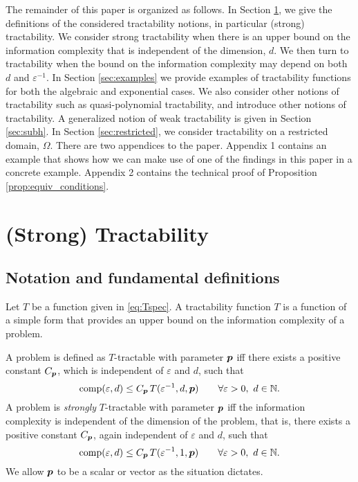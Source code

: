 \documentclass[sort&compress]{elsarticle}
\begin{document}
The remainder of this paper is organized as follows. In Section \ref{sec:spt}, we give the definitions of the considered tractability notions, in particular (strong) tractability. We consider strong tractability when there is an upper bound on the information complexity that is independent of the dimension, $d$. We then turn to tractability when the bound on the information complexity may depend on both $d$ and $\varepsilon^{-1}$. In Section \ref{sec:examples} we provide examples of tractability functions for both the algebraic and exponential cases. We also consider other notions of tractability such as quasi-polynomial tractability, and introduce other notions of tractability. A generalized notion of weak tractability is given in Section \ref{sec:subh}. In Section \ref{sec:restricted}, we consider tractability on a restricted domain, $\Omega$. There are two appendices to the paper. Appendix 1 contains an example that shows how we can make use of one of the findings in this paper in a concrete example. Appendix 2 contains the technical proof of Proposition \ref{prop:equiv_conditions}.

\section{(Strong) Tractability}\label{sec:spt}

\subsection{Notation and fundamental definitions} \label{sec:not}
Let $T$ be a function given in \eqref{eq:Tspec}.
A tractability function $T$ is a function of a simple form that provides an upper bound on the information complexity of a problem.


\begin{definition}
    A problem is defined as $T$-tractable with parameter $\boldsymbol{p}$ iff there exists a positive constant $C_{\boldsymbol{p}}$, which is independent of $\varepsilon$ and $d$, such that
\begin{equation} \label{eq:tract_def}
	\operatorname{comp}(\varepsilon,d) \le C_{\boldsymbol{p}}\, T(\varepsilon^{-1},d,\boldsymbol{p}) \qquad \forall \varepsilon >0, \ d \in \mathbb{N}.
\end{equation}
A problem is \emph{strongly}
$T$-tractable with parameter $\boldsymbol{p}$ iff the information complexity is independent of the dimension of the problem, that is, there exists a positive constant $C_{\boldsymbol{p}}$, again independent of $\varepsilon$ and $d$, such that
\begin{equation} \label{eq:strong_tract_def}
	\operatorname{comp}(\varepsilon,d) \le C_{\boldsymbol{p}}\, T(\varepsilon^{-1},1,\boldsymbol{p}) \qquad \forall \varepsilon >0 , \ d \in \mathbb{N}.
\end{equation}
We allow $\boldsymbol{p}$ to be a scalar or vector as the situation dictates.
\end{definition}
\end{document}
